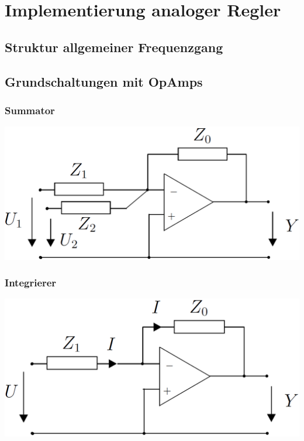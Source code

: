 \section{Implementierung analoger Regler}


\subsection{Struktur allgemeiner Frequenzgang}


\subsection{Grundschaltungen mit OpAmps}

\subsubsection{Summator}

\begin{minipage}[c]{0.48\columnwidth}
    \includegraphics[width=\columnwidth]{images/opamp_grundschaltung_2_eingaenge.png}
\end{minipage}
\hfill
\begin{minipage}[c]{0.48\columnwidth}
    
\end{minipage}


\subsubsection{Integrierer}

\begin{minipage}[c]{0.48\columnwidth}
    \includegraphics[width=\columnwidth]{images/opamp_grundschaltung_1_eingang.png}
\end{minipage}
\hfill
\begin{minipage}[c]{0.48\columnwidth}
    
\end{minipage}


